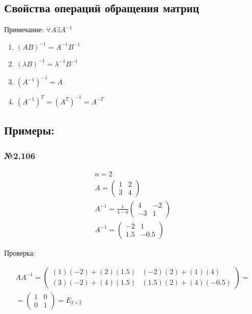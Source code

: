 \documentclass{article}
\begin{document}
\subsection{Свойства операций обращения матриц}

Примечание: $\forall A \exists A^{-1}$

\begin{enumerate}
	\item $(AB)^{-1} = A^{-1} B^{-1}$
	\item $(\lambda B)^{-1} = \lambda^{-1} B^{-1}$
	\item $(A^{-1})^{-1} = A$
	\item $(A^{-1})^T = (A^T)^{-1} = A^{-T}$
\end{enumerate}

\subsection{Примеры:}

\subsubsection*{№2.106}

\begin{gather*}
	n = 2 \\
	A = \begin{pmatrix}
		1 & 2 \\
		3 & 4
	\end{pmatrix} \\
	A^{-1} = \frac{1}{4 - 6} \begin{pmatrix}
		4 & -2 \\
		-3 & 1
	\end{pmatrix} \\
	A^{-1} = \begin{pmatrix}
		-2 & 1 \\
		1.5 & -0.5
	\end{pmatrix}
\end{gather*}

Проверка:

\begin{gather*}
	A A^{-1} = \begin{pmatrix}
		(1)(-2) + (2)(1.5) & (-2)(2) + (1)(4) \\
		(3)(-2) + (4)(1.5) & (1.5)(2) + (4)(-0.5)
	\end{pmatrix} = \\
	= \begin{pmatrix}
		1 & 0 \\
		0 & 1
	\end{pmatrix} = E_{2 \times 2}
\end{gather*}
\end{document}
